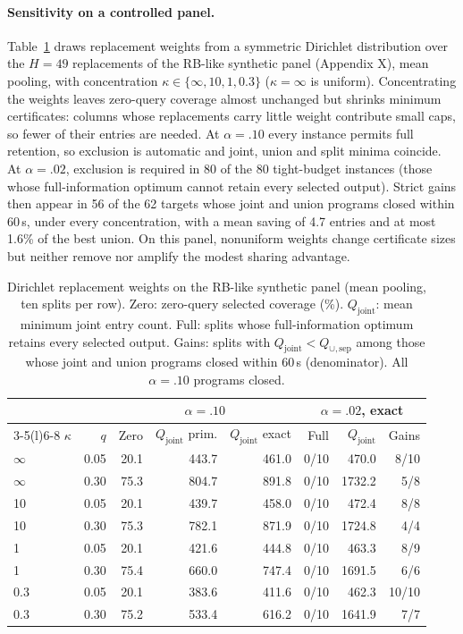 \documentclass[11pt]{article}
\newcommand{\Qj}{Q_{\mathrm{joint}}}
\newcommand{\Qu}{Q_{\cup,\mathrm{sep}}}
\begin{document}
\paragraph{Sensitivity on a controlled panel.} Table~\ref{tab:dirichlet} draws replacement weights from a symmetric Dirichlet distribution over the $H=49$ replacements of the RB-like synthetic panel (Appendix X), mean pooling, with concentration $\kappa\in\{\infty,10,1,0.3\}$ ($\kappa=\infty$ is uniform). Concentrating the weights leaves zero-query coverage almost unchanged but shrinks minimum certificates: columns whose replacements carry little weight contribute small caps, so fewer of their entries are needed. At $\alpha=.10$ every instance permits full retention, so exclusion is automatic and joint, union and split minima coincide. At $\alpha=.02$, exclusion is required in 80 of the 80 tight-budget instances (those whose full-information optimum cannot retain every selected output). Strict gains then appear in 56 of the 62 targets whose joint and union programs closed within 60\,s, under every concentration, with a mean saving of 4.7 entries and at most 1.6\% of the best union. On this panel, nonuniform weights change certificate sizes but neither remove nor amplify the modest sharing advantage.

\begin{table}[t]
\centering\footnotesize
\setlength{\tabcolsep}{1.6pt}
\begin{tabular}{@{}lr rrr rrr@{}}
\toprule
& & \multicolumn{3}{c}{$\alpha=.10$} & \multicolumn{3}{c}{$\alpha=.02$, exact}\\
\cmidrule(lr){3-5}\cmidrule(l){6-8}
$\kappa$ & $q$ & Zero & $\Qj$ prim. & $\Qj$ exact & Full & $\Qj$ & Gains\\
\midrule
$\infty$ & 0.05 & 20.1 & 443.7 & 461.0 & 0/10 & 470.0 & 8/10\\
$\infty$ & 0.30 & 75.3 & 804.7 & 891.8 & 0/10 & 1732.2 & 5/8\\
10 & 0.05 & 20.1 & 439.7 & 458.0 & 0/10 & 472.4 & 8/8\\
10 & 0.30 & 75.3 & 782.1 & 871.9 & 0/10 & 1724.8 & 4/4\\
1 & 0.05 & 20.1 & 421.6 & 444.8 & 0/10 & 463.3 & 8/9\\
1 & 0.30 & 75.4 & 660.0 & 747.4 & 0/10 & 1691.5 & 6/6\\
0.3 & 0.05 & 20.1 & 383.6 & 411.6 & 0/10 & 462.3 & 10/10\\
0.3 & 0.30 & 75.2 & 533.4 & 616.2 & 0/10 & 1641.9 & 7/7\\
\bottomrule
\end{tabular}
\caption{Dirichlet replacement weights on the RB-like synthetic panel (mean pooling, ten splits per row). Zero: zero-query selected coverage (\%). $\Qj$: mean minimum joint entry count. Full: splits whose full-information optimum retains every selected output. Gains: splits with $\Qj<\Qu$ among those whose joint and union programs closed within 60\,s (denominator). All $\alpha=.10$ programs closed.}
\label{tab:dirichlet}
\end{table}
\end{document}
